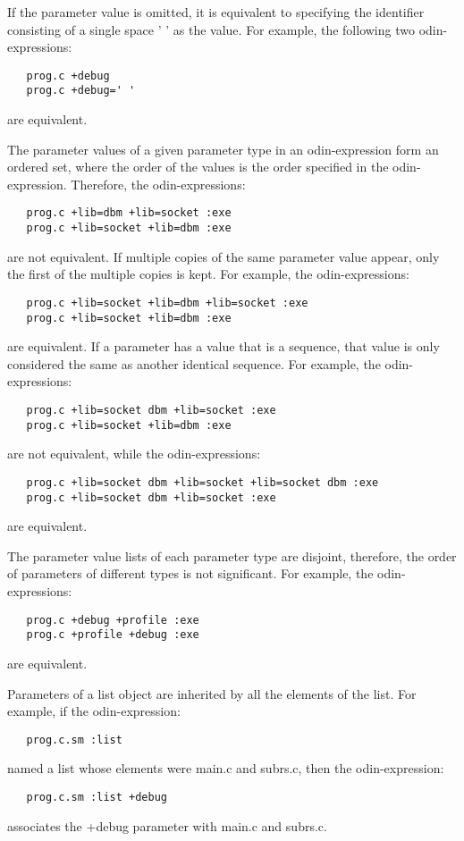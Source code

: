 If the parameter value is omitted,
it is equivalent to specifying the identifier consisting of a single space
{\ex ' '} as the value.
For example, the following two odin-expressions:
\begin{verbatim}
   prog.c +debug
   prog.c +debug=' '
\end{verbatim}
are equivalent.

The parameter values of a given parameter type in an odin-expression
form an ordered set,
where the order of the values is the order specified in the odin-expression.
Therefore, the odin-expressions:
\begin{verbatim}
   prog.c +lib=dbm +lib=socket :exe
   prog.c +lib=socket +lib=dbm :exe
\end{verbatim}
are not equivalent.
If multiple copies of the same parameter value appear, only the first
of the multiple copies is kept.
For example, the odin-expressions:
\begin{verbatim}
   prog.c +lib=socket +lib=dbm +lib=socket :exe
   prog.c +lib=socket +lib=dbm :exe
\end{verbatim}
are equivalent.
If a parameter has a value that is a sequence,
that value is only considered the same as another identical sequence.
For example, the odin-expressions:
\begin{verbatim}
   prog.c +lib=socket dbm +lib=socket :exe
   prog.c +lib=socket +lib=dbm :exe
\end{verbatim}
are not equivalent, while the odin-expressions:
\begin{verbatim}
   prog.c +lib=socket dbm +lib=socket +lib=socket dbm :exe
   prog.c +lib=socket dbm +lib=socket :exe
\end{verbatim}
are equivalent.

The parameter value lists of each parameter type are disjoint,
therefore, the order of parameters of different types is not significant.
For example, the odin-expressions:
\begin{verbatim}
   prog.c +debug +profile :exe
   prog.c +profile +debug :exe
\end{verbatim}
are equivalent.

Parameters of a list object are inherited by all the elements of the list.
For example, if the odin-expression:
\begin{verbatim}
   prog.c.sm :list
\end{verbatim}
named a list whose elements were {\ex main.c} and {\ex subrs.c},
then the odin-expression:
\begin{verbatim}
   prog.c.sm :list +debug
\end{verbatim}
associates the {\ex +debug} parameter with {\ex main.c} and {\ex subrs.c}.

